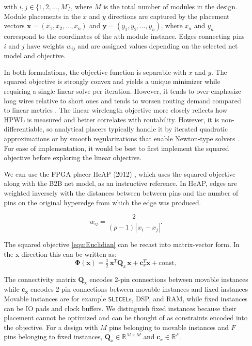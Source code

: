 with $i, j \in \{1, 2, ..., M\}$, where $M$ is the total number of modules in the design.
Module placements in the $x$ and $y$ directions are captured by the placement vectors \( \boldsymbol{x} = (x_1, x_2, ..., x_n) \) and \( \boldsymbol{y} = (y_1, y_2, ..., y_n) \), where $x_n$ and $y_n$ correspond to the coordinates of the $n$th module instance.
Edges connecting pins $i$ and $j$ have weights $w_{ij}$ and are assigned values depending on the selected net model and objective.

In both formulations, the objective function is separable with $x$ and $y$.
The squared objective is strongly convex and yields a unique minimizer while requiring a single linear solve per iteration. 
However, it tends to over-emphasize long wires relative to short ones and tends to worsen routing demand compared to linear metrics \cite{AP_2000}. 
The linear wirelength objective more closely reflects how HPWL is measured and better correlates with routability. 
However, it is non-differentiable, so analytical placers typically handle it by iterated quadratic approximations or by smooth regularizations that enable Newton-type solvers \cite{AP_2000}. 
For ease of implementation, it would be best to first implement the squared objective before exploring the linear objective.

We can use the FPGA placer HeAP (2012) \cite{AP_2012}, which uses the squared objective along with the B2B net model, as an instructive reference.
In HeAP, edges are weighted inversely with the distances between between pins and the number of pins on the original hyperedge from which the edge was produced.

\begin{equation}
    w_{ij} = \frac{2}{(p-1)\,|x_i - x_j|}.
    \label{equ:weight_linearized}
\end{equation}


The squared objective \ref{equ:Euclidian} can be recast into matrix-vector form.
In the x-direction this can be written as:
\begin{equation}
    \boldsymbol{\Phi} (\boldsymbol{x}) 
    = \tfrac{1}{2}\,\boldsymbol{x}^T \boldsymbol{Q}_x\,\boldsymbol{x} + \boldsymbol{c}_x^T \boldsymbol{x} + \text{const},
    \label{equ:quadratic}
\end{equation}

The connectivity matrix $\boldsymbol{Q_x}$ encodes 2-pin connections between movable instances while $\boldsymbol{c_x}$ encodes 2-pin connections between movable instances and fixed instances   
Movable instances are for example \texttt{SLICEL}s, DSP, and RAM, while fixed instances can be IO pads and clock buffers.
We distinguish fixed instances because their placement cannot be optimized and can be thought of as constraints encoded into the objective.
For a design with $M$ pins belonging to movable instances and $F$ pins belonging to fixed instances, $\boldsymbol{Q}_x \in {\mathbb{R}}^{M \times M}$ and $\boldsymbol{c}_x \in {\mathbb{R}}^F$.

